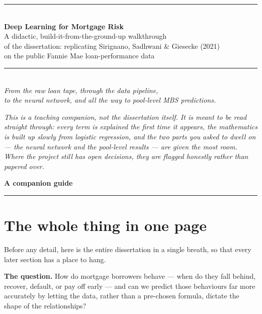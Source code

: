 \documentclass[11pt]{article}
\begin{document}
\begin{titlepage}
\centering
\vspace*{2.2cm}
{\color{accent}\rule{\linewidth}{1.2pt}}\\[14pt]
{\Huge\bfseries Deep Learning for Mortgage Risk}\\[10pt]
{\LARGE A didactic, build-it-from-the-ground-up walkthrough}\\[10pt]
{\large of the dissertation: replicating Sirignano, Sadhwani \& Giesecke (2021)\\[2pt]
on the public Fannie Mae loan-performance data}\\[8pt]
{\color{accent}\rule{\linewidth}{1.2pt}}\\[26pt]

{\large\itshape From the raw loan tape, through the data pipeline,\\
to the neural network, and all the way to pool-level MBS predictions.}\\[40pt]

\begin{minipage}{0.82\linewidth}\small\itshape
\color{ink}
This is a teaching companion, not the dissertation itself. It is meant to be read
straight through: every term is explained the first time it appears, the mathematics
is built up slowly from logistic regression, and the two parts you asked to dwell on
--- the neural network and the pool-level results --- are given the most room.
Where the project still has open decisions, they are flagged honestly rather than
papered over.
\end{minipage}

\vfill
{\large\bfseries A companion guide}\\[2pt]
{\color{softrule}\rule{0.4\linewidth}{0.6pt}}
\end{titlepage}

\thispagestyle{empty}
\tableofcontents
\newpage

\section{The whole thing in one page}
\label{sec:bigpicture}

Before any detail, here is the entire dissertation in a single breath, so that every
later section has a place to hang.

\textbf{The question.} How do mortgage borrowers behave --- when do they fall behind,
recover, default, or pay off early --- and can we predict those behaviours far more
accurately by letting the data, rather than a pre-chosen formula, dictate the shape of
the relationships?
\end{document}
